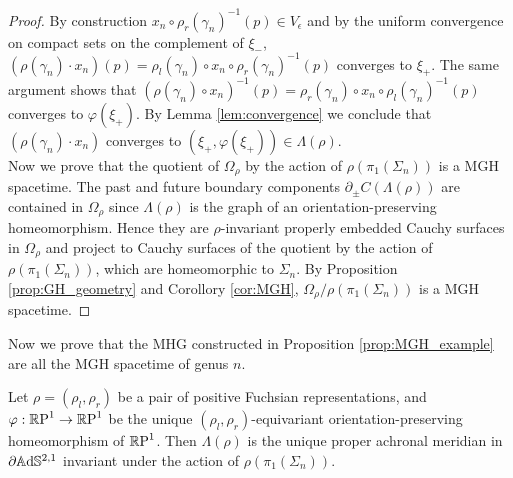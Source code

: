 \begin{proof}
    By construction $x_n \circ \rho_r(\gamma_n)^{-1}(p) \in V_\epsilon$ and by the uniform convergence on compact sets on the complement of $\xi_-$, $(\rho(\gamma_n) \cdot x_n) (p) = \rho_l(\gamma_n)\circ x_n \circ \rho_r(\gamma_n)^{-1}(p)$ converges to $\xi_+$. The same argument shows that $(\rho(\gamma_n) \circ x_n)^{-1}(p) = \rho_r(\gamma_n)\circ x_n \circ \rho_l(\gamma_n)^{-1}(p)$ converges to $\varphi(\xi_+)$. By Lemma \ref{lem:convergence} we conclude that $(\rho(\gamma_n)\cdot x_n)$ converges to $(\xi_+, \varphi(\xi_+)) \in \Lambda(\rho)$.\\
    Now we prove that the quotient of $\Omega_\rho$ by the action of $\rho(\pi_1(\Sigma_n))$ is a MGH spacetime. The past and future boundary components $\partial_\pm C(\Lambda(\rho))$ are contained in $\Omega_\rho$ since $\Lambda(\rho)$ is the graph of an orientation-preserving homeomorphism. Hence they are $\rho$-invariant properly embedded Cauchy surfaces in $\Omega_\rho$ and project to Cauchy surfaces of the quotient by the action of $\rho(\pi_1(\Sigma_n))$, which are homeomorphic to $\Sigma_n$. By Proposition \ref{prop:GH_geometry} and Corollory \ref{cor:MGH}, $\Omega_\rho / \rho(\pi_1(\Sigma_n))$ is a MGH spacetime.
\end{proof}
Now we prove that the MHG constructed in Proposition \ref{prop:MGH_example} are all the MGH spacetime of genus $n$.
\begin{lemma}
    Let $\rho=(\rho_l,\rho_r)$ be a pair of positive Fuchsian representations, and $\varphi :\S \to \S$ be the unique $(\rho_l,\rho_r)$-equivariant orientation-preserving homeomorphism of $\S$. Then $\Lambda(\rho)$ is the unique proper achronal meridian in $\partial \A^{2,1}$ invariant under the action of $\rho(\pi_1(\Sigma_n))$.
\end{lemma}
